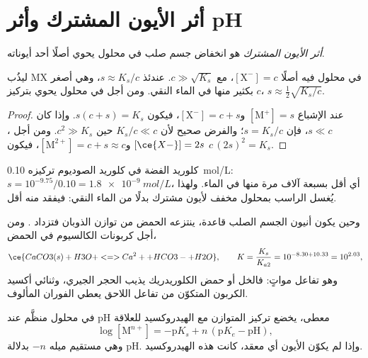 \section{أثر الأيون المشترك وأثر pH}

\begin{definition}\label{def:b1:precipitation:common-ion}
\emph{أثر الأيون المشترك} هو انخفاض
 جسم صلب في محلول يحوي أصلًا أحد
أيوناته.
\end{definition}

\begin{proposition}\label{prop:b1:precipitation:common-ion}
ليذُب MX في محلول فيه أصلًا $[\mathrm{X}^-] = c$، مع
$c \gg \sqrt{K_s}$. عندئذ $s \approx K_s/c$، وهي أصغر بكثير منها في الماء
النقي. ومن أجل  في محلول يحوي  بتركيز $c$،
$s \approx \frac12\sqrt{K_s/c}$.
\end{proposition}

\begin{proof}
عند الإشباع $[\mathrm{M}^+] = s$ و$[\mathrm{X}^-] = c + s$، فيكون
$s(c + s) = K_s$. وإذا كان $s \ll c$، فإن $s = K_s/c$؛ والفرض صحيح لأن
$K_s/c \ll c$ حين $c^2 \gg K_s$. ومن أجل ، $[\ce{X-}] = 2s$
و$[\mathrm{M}^{2+}] = c + s \approx c$، فيكون $c\,(2s)^2 = K_s$.
\end{proof}

كلوريد الفضة في كلوريد الصوديوم تركيزه \qty{0.10}{mol/L}: $s = 10^{-9.75}/0.10
= \qty{1.8e-9}{mol/L}$، أي أقل بسبعة آلاف مرة منها في الماء. ولهذا
يُغسل الراسب بمحلول مخفف لأيون مشترك بدلًا من
الماء النقي: فيفقد منه أقل.

وحين يكون أنيون الجسم الصلب قاعدة، ينتزعه الحمض من
توازن الذوبان فتزداد . ومن أجل كربونات الكالسيوم في
الحمض،
\[
  \ce{CaCO3(s) + H3O+ <=> Ca^2+ + HCO3- + H2O}, \qquad
  K = \frac{K_s}{K_{a2}} = 10^{-8.30 + 10.33} = 10^{2.03} ,
\]
وهو تفاعل مواتٍ: فالخل أو حمض الكلوريدريك يذيب الحجر الجيري،
وثنائي أكسيد الكربون المتكوّن من تفاعل
 اللاحق يعطي الفوران المألوف.

\begin{proposition}\label{prop:b1:precipitation:hydroxide-ph}
في محلول منظَّم عند pH معطى، يخضع تركيز 
المتوازن مع الهيدروكسيد  للعلاقة
\[
  \log[\mathrm{M}^{n+}] = -\mathrm{p}K_s + n\,(\mathrm{p}K_e - \mathrm{pH}) ,
\]
وهي مستقيم ميله $-n$ بدلالة pH. وإذا لم يكوّن الأيون أي معقد،
كانت هذه  الهيدروكسيد.
\end{proposition}

